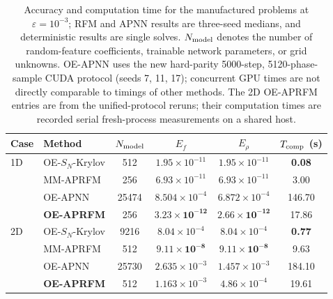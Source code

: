 \begin{table}[!htb]
\centering
\small
\setlength{\tabcolsep}{3.5pt}
\caption{Accuracy and computation time for the manufactured problems at $\varepsilon=10^{-3}$; RFM and APNN results are three-seed medians, and deterministic results are single solves.
$N_{\rm model}$ denotes the number of random-feature coefficients, trainable network parameters, or grid unknowns. OE-APNN uses the new hard-parity 5000-step, 5120-phase-sample CUDA protocol (seeds 7, 11, 17); concurrent GPU times are not directly comparable to timings of other methods. The 2D OE-APRFM entries are from the unified-protocol reruns; their computation times are recorded serial fresh-process measurements on a shared host.}
\label{tab:efficiency-summary}
\begin{tabular}{llcccc}
\toprule
Case & Method & $N_{\rm model}$ & $E_f$ & $E_\rho$ & $T_{\rm comp}$ (s) \\
\midrule
1D & OE-$S_N$-Krylov & 512
   & $1.95\times10^{-11}$ & $1.95\times10^{-11}$ & \textbf{0.08} \\
   & MM-APRFM & 256
   & $6.93\times10^{-11}$ & $6.93\times10^{-11}$ & 3.00 \\
   & OE-APNN & 25474
   & $8.504\times10^{-4}$ & $6.872\times10^{-4}$ & 146.70\\
   & \textbf{OE-APRFM} & 256
   & $\boldsymbol{3.23\times10^{-12}}$
   & $\boldsymbol{2.66\times10^{-12}}$ & 17.86 \\
\addlinespace
2D & OE-$S_N$-Krylov & 9216
   & $8.04\times10^{-4}$ & $8.04\times10^{-4}$ & \textbf{0.77} \\
   & MM-APRFM & 512
   & $\boldsymbol{9.11\times10^{-8}}$
   & $\boldsymbol{9.11\times10^{-8}}$ & 9.63 \\
   & OE-APNN & 25730
   & $2.635\times10^{-3}$ & $1.457\times10^{-3}$ & 184.10\\
   & \textbf{OE-APRFM} & 512
   & $1.163\times10^{-3}$ & $4.86\times10^{-4}$ & 19.61 \\
\bottomrule
\end{tabular}
\end{table}

